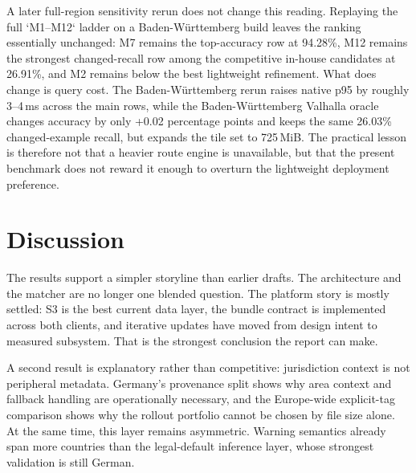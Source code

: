 \documentclass{article}
\begin{document}
A later full-region sensitivity rerun does not change this reading. Replaying the full `M1--M12` ladder on a Baden-W\"urttemberg build leaves the ranking essentially unchanged: M7 remains the top-accuracy row at 94.28\%, M12 remains the strongest changed-recall row among the competitive in-house candidates at 26.91\%, and M2 remains below the best lightweight refinement. What does change is query cost. The Baden-W\"urttemberg rerun raises native p95 by roughly 3--4\,ms across the main rows, while the Baden-W\"urttemberg Valhalla oracle changes accuracy by only +0.02 percentage points and keeps the same 26.03\% changed-example recall, but expands the tile set to 725\,MiB. The practical lesson is therefore not that a heavier route engine is unavailable, but that the present benchmark does not reward it enough to overturn the lightweight deployment preference.

\section{Discussion}
The results support a simpler storyline than earlier drafts. The architecture and the matcher are no longer one blended question. The platform story is mostly settled: S3 is the best current data layer, the bundle contract is implemented across both clients, and iterative updates have moved from design intent to measured subsystem. That is the strongest conclusion the report can make.

A second result is explanatory rather than competitive: jurisdiction context is not peripheral metadata. Germany's provenance split shows why area context and fallback handling are operationally necessary, and the Europe-wide explicit-tag comparison shows why the rollout portfolio cannot be chosen by file size alone. At the same time, this layer remains asymmetric. Warning semantics already span more countries than the legal-default inference layer, whose strongest validation is still German.
\end{document}
